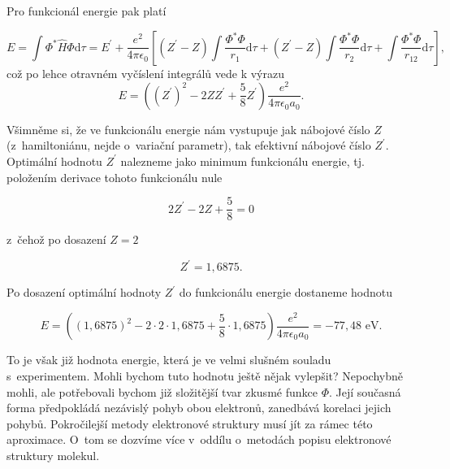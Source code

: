\noindent Pro funkcionál energie pak platí

\begin{equation}
E = \int \Phi^{\ast} \hat{H} \Phi \mathrm{d}\tau = E^{\prime} + \frac{e^2}{4 \pi \epsilon_0} \left[ (Z^{\prime} - Z) \int \frac{\Phi^{\ast}\Phi}{r_1} \mathrm{d}\tau + (Z^{\prime} - Z) \int \frac{\Phi^{\ast}\Phi}{r_2} \mathrm{d}\tau + \int \frac{\Phi^{\ast}\Phi}{r_{12}} \mathrm{d}\tau \right],
\label{rov:VE-19}
\end{equation}
což po lehce otravném vyčíslení integrálů vede k výrazu
\begin{equation}
E = \left( (Z^{\prime})^2 - 2 Z Z^{\prime} + \frac{5}{8} Z^{\prime} \right) \frac{e^2}{4 \pi \epsilon_0 a_0}.
\label{rov:VE-20}
\end{equation}

\noindent Všimněme si, že ve funkcionálu energie nám vystupuje jak nábojové číslo $Z$ (z~hamiltoniánu, nejde o~variační parametr), tak efektivní nábojové číslo $Z^{\prime}$. Optimální hodnotu $Z^{\prime}$ nalezneme jako minimum funkcionálu energie, tj. položením derivace tohoto funkcionálu nule

\begin{equation}
2 Z^{\prime} - 2Z + \frac{5}{8} = 0 \nonumber
\end{equation}

\noindent z~čehož po dosazení $Z = 2$

\begin{equation}
Z^{\prime} = 1{,}6875. \nonumber
\end{equation}

\noindent Po dosazení optimální hodnoty $Z^{\prime}$ do funkcionálu energie dostaneme hodnotu 

\begin{equation}
E = \left( (1{,}6875)^2 - 2 \cdot 2 \cdot 1{,}6875 + \frac{5}{8} \cdot 1{,}6875 \right) \frac{e^2}{4 \pi \epsilon_0 a_0} = - 77{,}48 \mbox{ eV}.
\label{rov:VE-21}
\end{equation}

\noindent To je však již hodnota energie, která je ve velmi slušném souladu s~experimentem. Mohli bychom tuto hodnotu ještě nějak vylepšit? Nepochybně mohli, ale potřebovali bychom již složitější tvar zkusmé funkce $\Phi$. Její současná forma předpokládá nezávislý pohyb obou elektronů, zanedbává korelaci jejich pohybů. Pokročilejší metody elektronové struktury musí jít za rámec této aproximace. O~tom se dozvíme více v~oddílu o~metodách popisu elektronové struktury molekul. 

